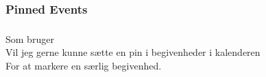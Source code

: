 \subsubsection{Pinned Events}

\subsubsection{}
Som bruger \\Vil jeg gerne kunne sætte en pin i begivenheder i kalenderen 
\\For at markere en særlig begivenhed.
